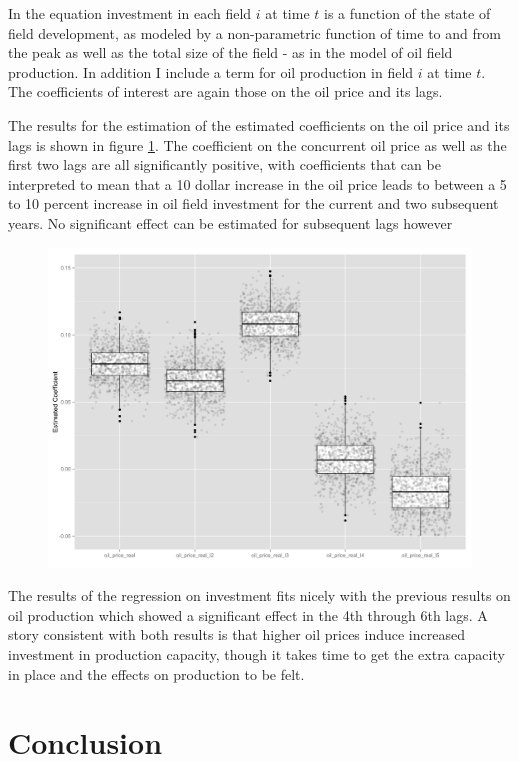 \documentclass[12pt]{scrartcl} %
\begin{document}
In the equation investment in each field $i$ at time $t$ is a function of the state of field development, as modeled by a non-parametric function of time to and from the peak as well as the total size of the field - as in the model of oil field production.  In addition I include a term for oil production in field $i$ at time $t$.  The coefficients of interest are again those on the oil price and its lags.  

The results for the estimation of the estimated coefficients on the oil price and its lags is shown in figure \ref{gam_price_invest_box}.  The coefficient on the concurrent oil price as well as the first two lags are all significantly positive, with coefficients that can be interpreted to mean that a 10 dollar increase in the oil price leads to between a 5 to 10 percent increase in oil field investment for the current and two subsequent years.  No significant effect can be estimated for subsequent lags however

\begin{figure}
	\includegraphics[width=.8\textwidth]{gam_price_invest_box.png}
	\caption{}
	\label{gam_price_invest_box}
\end{figure}

The results of the regression on investment fits nicely with the previous results on oil production which showed a significant effect in the 4th through 6th lags.  A story consistent with both results is that higher oil prices induce increased investment in production capacity, though it takes time to get the extra capacity in place and the effects on production to be felt.

\section{Conclusion}
\end{document}
